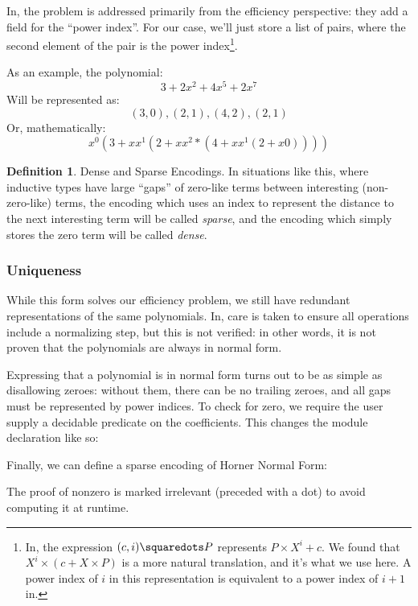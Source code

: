 \documentclass[draft, twocolumn]{article}
\theoremstyle{definition}
\newtheorem{definition}{Definition}[section]
\theoremstyle{remark}
\begin{document}
In\cite{hutchison_proving_2005}, the problem is addressed primarily from the
efficiency perspective: they add a field for the ``power index''. For our case,
we'll just store a list of pairs, where the second element of the pair is the
power index\footnote{
  In\cite{hutchison_proving_2005}, the expression \((c , i) \squaredots P\)
  represents \(P \times X^i + c\). We found that \(X^i \times (c + X \times P)\)
  is a more natural translation, and it's what we use here. A power index of
  \(i\) in this representation is equivalent to a power index of \(i+1\)
  in\cite{hutchison_proving_2005}.
}.

As an example, the polynomial:
\[ 3 + 2x^2 + 4x^5 + 2x^7 \]
Will be represented as:
\[ (3,0),(2,1),(4,2),(2,1) \]
Or, mathematically:
\[ x^0 (3 + x x^1 (2 + x x^2 * (4 + x x^1 (2 + x 0)))) \]

\begin{definition}{Dense and Sparse Encodings.}
  In situations like this, where inductive types have large ``gaps'' of
  zero-like terms between interesting (non-zero-like) terms, the encoding which
  uses an index to represent the distance to the next interesting term will be
  called \emph{sparse}, and the encoding which simply stores the zero term will
  be called \emph{dense}.
\end{definition}
\subsubsection{Uniqueness}
While this form solves our efficiency problem, we still have redundant
representations of the same polynomials. In\cite{hutchison_proving_2005}, care
is taken to ensure all operations include a normalizing step, but this is not
verified: in other words, it is not proven that the polynomials are always in
normal form.

Expressing that a polynomial is in normal form turns out to be as simple as
disallowing zeroes: without them, there can be no trailing zeroes, and all gaps
must be represented by power indices. To check for zero, we require the user
supply a decidable predicate on the coefficients. This changes the module
declaration like so:

Finally, we can define a sparse encoding of Horner Normal Form:

The proof of nonzero is marked irrelevant (preceded with a dot) to avoid
computing it at runtime.
\end{document}

